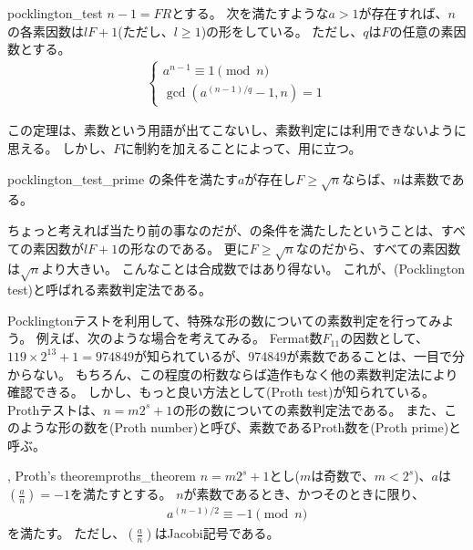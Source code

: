 \begin{Theo}{}{pocklington_test}
$n-1=FR$とする。
次を満たすような$a>1$が存在すれば、$n$の各素因数は$lF+1$(ただし、$l\ge1$)の形をしている。
ただし、$q$は$F$の任意の素因数とする。
\begin{align*}
\begin{cases}
a^{n-1} \equiv 1 \pmod{n}\\
\gcd(a^{(n-1)/q}-1, n) = 1
\end{cases}
\end{align*}
\end{Theo}

この定理は、素数という用語が出てこないし、素数判定には利用できないように思える。
しかし、$F$に制約を加えることによって、用に立つ。

\begin{Coro}{}{pocklington_test_prime}
の条件を満たす$a$が存在し$F\ge\sqrt{n}$ならば、$n$は素数である。
\end{Coro}

ちょっと考えれば当たり前の事なのだが、の条件を満たしたということは、すべての素因数が$lF+1$の形なのである。
更に$F\ge\sqrt{n}$なのだから、すべての素因数は$\sqrt{n}$より大きい。
こんなことは合成数ではあり得ない。
これが、(Pocklington test)と呼ばれる素数判定法である。


Pocklingtonテストを利用して、特殊な形の数についての素数判定を行ってみよう。
例えば、次のような場合を考えてみる。
Fermat数$F_{11}$の因数として、$119\times2^{13}+1=974849$が知られているが、974849が素数であることは、一目で分からない。
もちろん、この程度の桁数ならば造作もなく他の素数判定法により確認できる。
しかし、もっと良い方法として(Proth test)が知られている。
Prothテストは、$n = m2^s+1$の形の数についての素数判定法である。
また、このような形の数を(Proth number)と呼び、素数であるProth数を(Proth prime)と呼ぶ。

\begin{Theo}{, Proth's theorem}{proths_theorem}
$n=m2^s+1$とし($m$は奇数で、$m<2^s$)、$a$は$\left(\frac{a}{n}\right)=-1$を満たすとする。
$n$が素数であるとき、かつそのときに限り、
\begin{align*}
a^{(n-1)/2} \equiv -1 \pmod{n}
\end{align*}
を満たす。
ただし、$\left(\frac{a}{n}\right)$はJacobi記号である。
\end{Theo}

